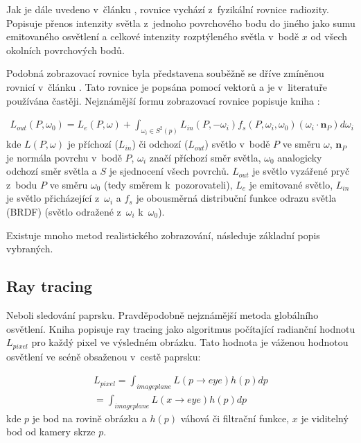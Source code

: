 Jak je dále uvedeno v~článku \cite{render_eq}, rovnice vychází z~fyzikální rovnice radiozity. Popisuje přenos intenzity světla z~jednoho povrchového bodu do jiného jako sumu emitovaného osvětlení a celkové intenzity rozptýleného světla v~bodě $x$ od všech okolních povrchových bodů.

Podobná zobrazovací rovnice byla představena souběžně se dříve zmíněnou rovnicí v~článku \cite{render_eq_2}. Tato rovnice je popsána pomocí vektorů a je v~literatuře používána častěji. Nejznámější formu zobrazovací rovnice popisuje kniha \cite{gfx_principles_practice}:

\begin{equation} \label{eq:render_2}
	\begin{gathered}
		L_{out}(P, \omega_0) = L_e(P, \omega) + \int_{\omega_i\in S^2(p)}L_{in}(P, -\omega_i)f_s(P, \omega_i, \omega_0)(\omega_i \cdot \textbf{n}_P)d\omega_i
	\end{gathered}
\end{equation}
kde $L(P, \omega)$ je příchozí ($L_{in}$) či odchozí ($L_{out}$) světlo v~bodě $P$ ve směru $\omega$, $\textbf{n}_P$ je normála povrchu v~bodě $P$, $\omega_i$ značí příchozí směr světla, $\omega_0$ analogicky odchozí směr světla a $S$ je sjednocení všech povrchů. $L_{out}$ je světlo vyzářené pryč z~bodu $P$ ve směru $\omega_0$ (tedy směrem k~pozorovateli), $L_e$ je emitované světlo, $L_{in}$ je světlo přicházející z~$\omega_i$ a $f_s$ je obousměrná distribuční funkce odrazu světla (BRDF) (světlo odražené z~$\omega_i$ k~$\omega_0$).

Existuje mnoho metod realistického zobrazování, následuje základní popis vybraných.

\subsection{Ray tracing}\label{sec:ray_tracing}
Neboli sledování paprsku. Pravděpodobně nejznámější metoda globálního osvětlení. Kniha \cite{advanced_global} popisuje ray tracing jako algoritmus počítající radianční hodnotu $L_{pixel}$ pro každý pixel ve výsledném obrázku. Tato hodnota je váženou hodnotou osvětlení ve scéně obsaženou v~cestě paprsku:

\begin{equation} \label{eq:rt_1}
	\begin{gathered}
		L_{pixel} = \int_{imageplane}L(p \xrightarrow{} eye)h(p)dp \\= \int_{imageplane}L(x \xrightarrow{} eye)h(p)dp
	\end{gathered}
\end{equation}
kde $p$ je bod na rovině obrázku a $h(p)$ váhová či filtrační funkce, $x$ je viditelný bod od kamery skrze $p$.


